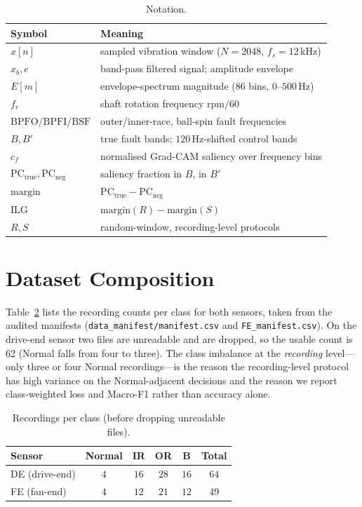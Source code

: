 \documentclass[11pt]{article}
\begin{document}
\begin{table}[H]
\centering
\caption{Notation.}
\label{tab:notation}
\begin{tabular}{ll}
\toprule
Symbol & Meaning \\
\midrule
$x[n]$ & sampled vibration window ($N=2048$, $f_s=12$\,kHz) \\
$x_b, e$ & band-pass filtered signal; amplitude envelope \\
$E[m]$ & envelope-spectrum magnitude (86 bins, $0$--$500$\,Hz) \\
$f_r$ & shaft rotation frequency $\mathrm{rpm}/60$ \\
$\mathrm{BPFO/BPFI/BSF}$ & outer/inner-race, ball-spin fault frequencies \\
$B, B'$ & true fault bands; $120$\,Hz-shifted control bands \\
$c_f$ & normalised Grad-CAM saliency over frequency bins \\
$\mathrm{PC_{true}}, \mathrm{PC_{neg}}$ & saliency fraction in $B$, in $B'$ \\
$\text{margin}$ & $\mathrm{PC_{true}}-\mathrm{PC_{neg}}$ \\
$\mathrm{ILG}$ & $\text{margin}(R)-\text{margin}(S)$ \\
$R, S$ & random-window, recording-level protocols \\
\bottomrule
\end{tabular}
\end{table}

\section{Dataset Composition}
\label{app:composition}
Table~\ref{tab:composition} lists the recording counts per class for both sensors, taken
from the audited manifests (\texttt{data\_manifest/manifest.csv} and \texttt{FE\_manifest.csv}).
On the drive-end sensor two files are unreadable and are dropped, so the usable count is 62
(Normal falls from four to three). The class imbalance at the \emph{recording} level---only
three or four Normal recordings---is the reason the recording-level protocol has high
variance on the Normal-adjacent decisions and the reason we report class-weighted loss and
Macro-F1 rather than accuracy alone.

\begin{table}[H]
\centering
\caption{Recordings per class (before dropping unreadable files).}
\label{tab:composition}
\begin{tabular}{lccccc}
\toprule
Sensor & Normal & IR & OR & B & Total \\
\midrule
DE (drive-end) & $4$ & $16$ & $28$ & $16$ & $64$ \\
FE (fan-end)   & $4$ & $12$ & $21$ & $12$ & $49$ \\
\bottomrule
\end{tabular}
\end{table}
\end{document}
